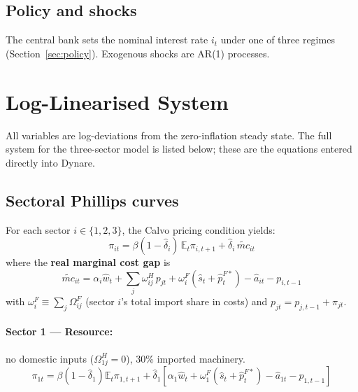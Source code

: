 \documentclass[11pt,a4paper]{article}
\newcommand{\E}{\mathbb{E}}
\newcommand{\wh}[1]{\widehat{#1}}
\begin{document}
\subsection{Policy and shocks}

The central bank sets the nominal interest rate $i_t$ under one of three regimes
(Section~\ref{sec:policy}).  Exogenous shocks are AR(1) processes.

\section{Log-Linearised System}

All variables are log-deviations from the zero-inflation steady state.
The full system for the three-sector model is listed below; these are
the equations entered directly into Dynare.

\subsection{Sectoral Phillips curves}

For each sector $i\in\{1,2,3\}$, the Calvo pricing condition yields:
\begin{equation}
\boxed{
\pi_{it}=\beta(1-\wh\delta_i)\,\E_t\pi_{i,t+1}
+\wh\delta_i\,\widetilde{mc}_{it}
}
\label{eq:PC_generic}
\end{equation}
where the \textbf{real marginal cost gap} is
\begin{equation}
\widetilde{mc}_{it}
=\alpha_i\wh w_t
+\sum_{j}\omega^H_{ij}\,p_{jt}
+\omega^F_i(\wh s_t+\wh p^{F*}_t)
-\wh a_{it}
-p_{i,t-1}
\label{eq:mctilde}
\end{equation}
with $\omega^F_i\equiv\sum_j\Omega^F_{ij}$ (sector $i$'s total import share
in costs) and $p_{jt}=p_{j,t-1}+\pi_{jt}$.

\paragraph{Sector 1 — Resource:} no domestic inputs ($\Omega^H_{1j}=0$),
30\% imported machinery.
\begin{equation}
\pi_{1t}=\beta(1-\wh\delta_1)\E_t\pi_{1,t+1}
+\wh\delta_1\!\left[\alpha_1\wh w_t+\omega^F_1(\wh s_t+\wh p^{F*}_t)-\wh a_{1t}-p_{1,t-1}\right]
\label{eq:PC1}
\end{equation}
\end{document}
